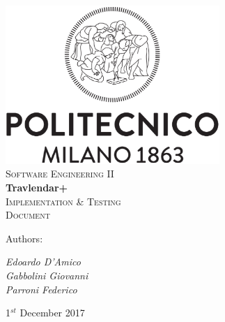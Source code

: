 \documentclass [11pt,a4paper,oneside,openany]{book} %
\begin{document}

\begin{titlepage}

 \begin{center} 
     \includegraphics[height=6cm]{logo.eps}\\
     \vspace{4em}
     {\Large \textsc{Software Engineering II}}\\
     \vspace{6em}
     {\LARGE \textbf{Travlendar+}}\\
     \vspace{3em}
     {\Large \textsc{Implementation \& Testing}}\\
     \vspace{1em}
     {\Large \textsc{Document}}\\
 \end{center}
 
    \vskip 2cm
 
 	Authors:
 	\vspace{0.5em}
 	\begin{center}
      {\Large \textit{Edoardo D'Amico}}\\
      {\Large \textit{Gabbolini Giovanni}}\\
      {\Large \textit{Parroni Federico}}\\
    \end{center}

\vskip 2.0cm
\begin{center}
{\normalsize 1$^{st}$ December 2017}
\end{center}

\end{titlepage}

\newpage

\pagestyle{fancy}
\renewcommand{\chaptername}{Chapter}
\renewcommand{\chaptermark} [1]{\chaptername\ \thechapter.\ #1}{} 
\renewcommand{\chaptermark}[1]{\markboth{\thechapter.\ #1}{}} 
\renewcommand{\sectionmark}[1]{\markright{\thesection\ #1}}
\fancyhf{}
\fancyhead[LE,RO]{\bfseries\thepage} 
\fancyhead[LO,RE]{\bfseries\leftmark}
\end{document}
